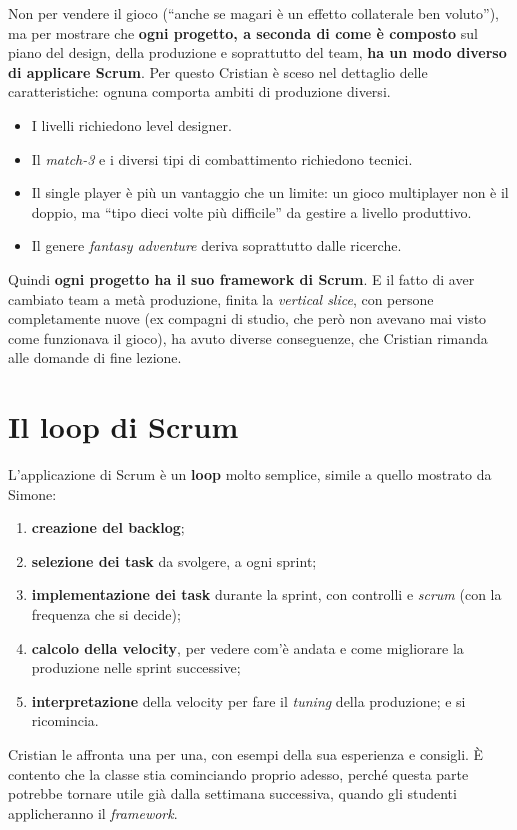 Non per vendere il gioco (``anche se magari è un effetto collaterale ben
voluto''), ma per mostrare che \textbf{ogni progetto, a seconda di come è
composto} sul piano del design, della produzione e soprattutto del team,
\textbf{ha un modo diverso di applicare Scrum}. Per questo Cristian è sceso nel
dettaglio delle caratteristiche: ognuna comporta ambiti di produzione diversi.
\begin{itemize}
  \item I livelli richiedono level designer.
  \item Il \emph{match-3} e i diversi tipi di combattimento richiedono
        tecnici.
  \item Il single player è più un vantaggio che un limite: un gioco
        multiplayer non è il doppio, ma ``tipo dieci volte più difficile'' da
        gestire a livello produttivo.
  \item Il genere \emph{fantasy adventure} deriva soprattutto dalle ricerche.
\end{itemize}
Quindi \textbf{ogni progetto ha il suo framework di Scrum}. E il fatto di
aver cambiato team a metà produzione, finita la \emph{vertical slice}, con
persone completamente nuove (ex compagni di studio, che però non avevano mai
visto come funzionava il gioco), ha avuto diverse conseguenze, che Cristian
rimanda alle domande di fine lezione.

\section{Il loop di Scrum}
\label{sec:z3-loop}

L'applicazione di Scrum è un \textbf{loop} molto semplice, simile a quello
mostrato da Simone:
\begin{enumerate}
  \item \textbf{creazione del backlog};
  \item \textbf{selezione dei task} da svolgere, a ogni sprint;
  \item \textbf{implementazione dei task} durante la sprint, con controlli e
        \emph{scrum} (con la frequenza che si decide);
  \item \textbf{calcolo della velocity}, per vedere com'è andata e come
        migliorare la produzione nelle sprint successive;
  \item \textbf{interpretazione} della velocity per fare il \emph{tuning}
        della produzione; e si ricomincia.
\end{enumerate}
Cristian le affronta una per una, con esempi della sua esperienza e consigli.
È contento che la classe stia cominciando proprio adesso, perché questa parte
potrebbe tornare utile già dalla settimana successiva, quando gli studenti
applicheranno il \emph{framework}.

